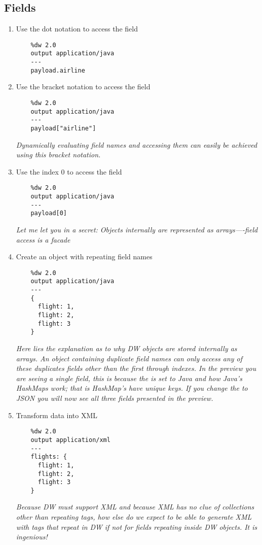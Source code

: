 \subsection{Fields}
\begin{enumerate}[resume*]
\item Use the dot notation to access the  field
  \begin{verbatim}
    %dw 2.0
    output application/java
    ---
    payload.airline    
  \end{verbatim}
\item Use the bracket notation to access the  field
  \begin{verbatim}
    %dw 2.0
    output application/java
    ---
    payload["airline"]    
  \end{verbatim}
  \emph{
    Dynamically evaluating field names and accessing them can easily be achieved using this bracket notation.
  }
\item Use the index 0 to access the  field
  \begin{verbatim}
    %dw 2.0
    output application/java
    ---
    payload[0]
  \end{verbatim}
  \emph{
    Let me let you in a secret: Objects internally are represented as arrays—-field access is a facade
  }
\item Create an object with repeating field names
  \begin{verbatim}
    %dw 2.0
    output application/java
    ---
    {
      flight: 1,
      flight: 2,
      flight: 3
    }
  \end{verbatim}
  \emph{
    Here lies the explanation as to why DW objects are stored internally as arrays.  An object containing duplicate field names can only access any of these duplicates fields other than the first through indexes.
    \newline
    In the preview you are seeing a single field, this is because the  is set to Java and how Java's HashMaps work; that is HashMap's have unique keys.  If you change the  to JSON you will now see all three fields presented in the preview.
    }
\item Transform data into XML
  \begin{verbatim}
    %dw 2.0
    output application/xml
    ---
    flights: {
      flight: 1,
      flight: 2,
      flight: 3
    }
  \end{verbatim}
  \emph{
    Because DW must support XML and because XML has no clue of collections other than repeating tags, how else do we expect to be able to generate XML with tags that repeat in DW if not for fields repeating inside DW objects.  It is ingenious!
  }
\end{enumerate}

